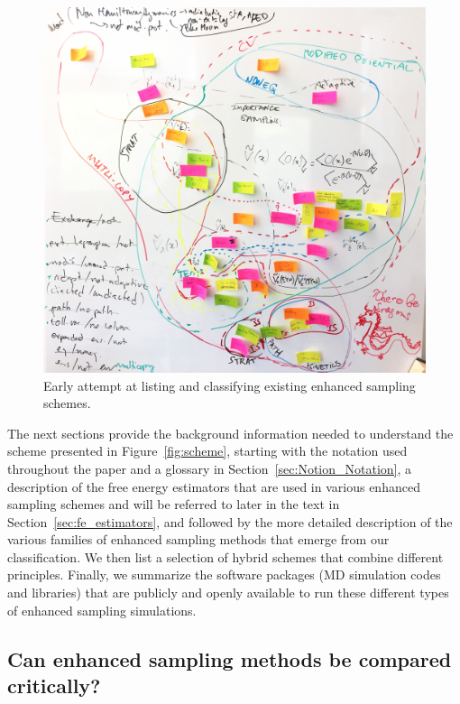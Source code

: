 \documentclass[9pt,review]{livecoms}
\begin{document}
\begin{figure}[!htb]
  \includegraphics[width=0.99\columnwidth] {Figures/Venn_Diagram_Early_Attempt.jpeg}
  \caption{Early attempt at listing and classifying existing enhanced sampling schemes.}
  \label{fig:VennD}
\end{figure}

The next sections provide the background information needed to understand the scheme presented in Figure~\ref{fig:scheme}, starting with the notation used throughout the paper and a glossary in Section~\ref{sec:Notion_Notation}, a description of the free energy estimators that are used in various enhanced sampling schemes and will be referred to later in the text in Section~\ref{sec:fe_estimators}, and followed by the more detailed description of the various families of enhanced sampling methods that emerge from our classification. We then list a selection of hybrid schemes that combine different principles. Finally, we summarize the software packages (MD simulation codes and libraries) that are publicly and openly available to run these different types of enhanced sampling simulations.


\subsection{Can enhanced sampling methods be compared critically?}
\label{sec:critical_comparison}
\end{document}
